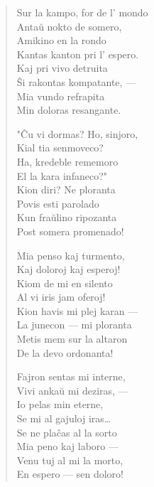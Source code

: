 \begin{verse}
                           Sur la kampo, for de l' mondo\\
                           Anta\u u nokto de somero,\\
                           Amikino en la rondo\\
                           Kantas kanton pri l' espero.\\
                           Kaj pri vivo detruita\\
                           \^Si rakontas kompatante, ---\\
                           Mia vundo refrapita\\
                           Min doloras resangante.

                           "\^Cu vi dormas? Ho, sinjoro,\\
                           Kial tia senmoveco?\\
                           Ha, kredeble rememoro\\
                           El la kara infaneco?"\\
                           Kion diri? Ne ploranta\\
                           Povis esti parolado\\
                           Kun fra\u ulino ripozanta\\
                           Post somera promenado!

                           Mia penso kaj turmento,\\
                           Kaj doloroj kaj esperoj!\\
                           Kiom de mi en silento\\
                           Al vi iris jam oferoj!\\
                           Kion havis mi plej karan ---\\
                           La junecon --- mi ploranta\\
                           Metis mem sur la altaron\\
                           De la devo ordonanta!

                           Fajron sentas mi interne,\\
                           Vivi anka\u u mi deziras, ---\\
                           Io pelas min eterne,\\
                           Se mi al gajuloj iras\dots\\
                           Se ne pla\^cas al la sorto\\
                           Mia peno kaj laboro ---\\
                           Venu tuj al mi la morto,\\
                           En espero --- sen doloro!

\end{verse}


\smallrule{}
